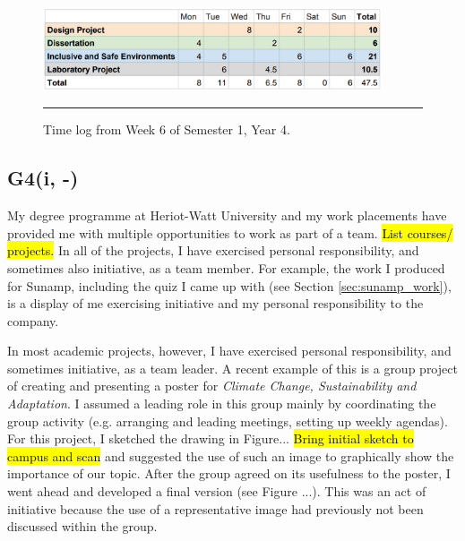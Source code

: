 \begin{figure}[htbp]
	\centering
	\includegraphics[width=10cm]{figures/y4s1w6hours.PNG}
	\rule{\textwidth}{0.5pt} %
	\caption{Time log from Week 6 of Semester 1, Year 4.}
	\label{fig_timelog}
\end{figure}


\subsection*{G4(i, -)}

My degree programme at Heriot-Watt University and my work placements have provided me with multiple opportunities to work as part of a team.
\hl{List courses/ projects.}
In all of the projects, I have exercised personal responsibility, and sometimes also initiative, as a team member.
For example, the work I produced for Sunamp, including the quiz I came up with (see Section \ref{sec:sunamp_work}), is a display of me exercising initiative and my personal responsibility to the company.

In most academic projects, however, I have exercised personal responsibility, and sometimes initiative, as a team leader.
A recent example of this is a group project of creating and presenting a poster for \textit{Climate Change, Sustainability and Adaptation}.
I assumed a leading role in this group mainly by coordinating the group activity (e.g. arranging and leading meetings, setting up weekly agendas).
For this project, I sketched the drawing in Figure... \hl{Bring initial sketch to campus and scan} and suggested the use of such an image to graphically show the importance of our topic.
After the group agreed on its usefulness to the poster, I went ahead and developed a final version (see Figure ...).
This was an act of initiative because the use of a representative image had previously not been discussed within the group.


